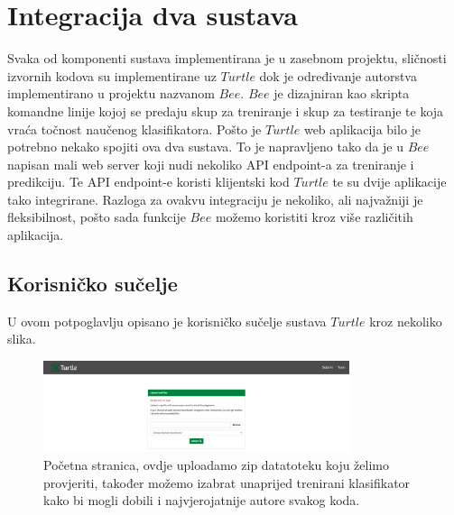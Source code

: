 \chapter{Integracija dva sustava}

Svaka od komponenti sustava implementirana je u zasebnom projektu, sličnosti izvornih kodova su implementirane uz $Turtle$ dok je određivanje autorstva implementirano u projektu nazvanom $Bee$. $Bee$ je dizajniran kao skripta komandne linije kojoj se predaju skup za treniranje i skup za testiranje te koja vraća točnost naučenog klasifikatora. Pošto je $Turtle$ web aplikacija bilo je potrebno nekako spojiti ova dva sustava. To je napravljeno tako da je u $Bee$ napisan mali web server koji nudi nekoliko API endpoint-a za treniranje i predikciju. Te API endpoint-e koristi klijentski kod $Turtle$ te su dvije aplikacije tako integrirane. Razloga za ovakvu integraciju je nekoliko, ali najvažniji je fleksibilnost, pošto sada funkcije $Bee$ možemo koristiti kroz više različitih aplikacija. 

\section{Korisničko sučelje}

U ovom potpoglavlju opisano je korisničko sučelje sustava $Turtle$ kroz nekoliko slika.


\begin{figure}[htb]
	\centering
	\includegraphics[width=0.8\textwidth,keepaspectratio]{fig/submit.png}
	\caption{Početna stranica, ovdje uploadamo zip datatoteku koju želimo provjeriti, također možemo izabrat unaprijed trenirani klasifikator kako bi mogli dobili i najvjerojatnije autore svakog koda.}
\end{figure}

\newpage
\vspace*{4cm}

